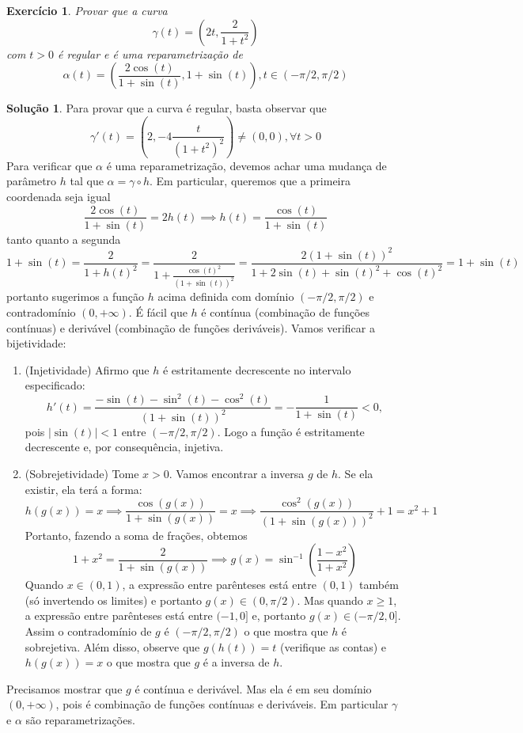 \documentclass[a4paper,12pt]{article}
\theoremstyle{exer}
\newtheorem{exercise}{Exercício}
\theoremstyle{definition}
\newtheorem{solution}{Solução}
\theoremstyle{plain}
\begin{document}
\begin{exercise}
    Provar que a curva
    $$\gamma(t) = \left(2t, \frac{2}{1+t^2}\right)$$ 
    com $t > 0$ é regular e é uma reparametrização de
    $$\alpha(t) = \left(\frac{2\cos(t)}{1 + \sin(t)}, 1 + \sin(t)\right), t
    \in (-\pi/2, \pi/2)$$
\end{exercise}

\begin{solution}
    Para provar que a curva é regular, basta observar que 
    $$
    \gamma '(t) = \left(2, -4\frac{t}{(1+ t^2)^2}\right) \neq (0,0), \forall t > 0
    $$
    Para verificar que $\alpha$ é uma reparametrização, devemos achar uma
    mudança de parâmetro $h$ tal que $\alpha = \gamma \circ h$. Em particular,
    queremos que a primeira coordenada seja igual
    $$
    \frac{2\cos(t)}{1 + \sin(t)} = 2h(t) \implies h(t) = \frac{\cos(t)}{1 + \sin(t)}
    $$
    tanto quanto a segunda 
    $$
    1 + \sin(t) = \frac{2}{1 + h(t)^2} = \frac{2}{1 + \frac{\cos(t)^2}{(1 + \sin(t))^2}} = \frac{2(1 + \sin(t))^2}{1 + 2\sin(t) + \sin(t)^2 + \cos(t)^2} = 1 + \sin(t)
    $$
    portanto sugerimos a função $h$ acima definida com domínio
    $(-\pi/2,\pi/2)$ e contradomínio $(0, + \infty)$. É fácil que $h$ é
    contínua (combinação de funções contínuas) e derivável (combinação de
    funções deriváveis). Vamos verificar a bijetividade: 
    \begin{enumerate}
        \item (Injetividade) Afirmo que $h$ é estritamente decrescente no
        intervalo especificado: 
        $$
        h'(t) = \frac{-\sin(t) -\sin^2(t) - \cos^2(t)}{(1 + \sin(t))^2} = -\frac{1}{1 + \sin(t)} < 0, 
        $$
        pois $|\sin(t)| < 1$ entre $(-\pi/2, \pi/2)$. Logo a função é
        estritamente decrescente e, por consequência, injetiva. 
        
        \item (Sobrejetividade) Tome $x > 0$. Vamos encontrar a inversa $g$ de
        $h$. Se ela existir, ela terá a forma: 
        $$
        h(g(x)) = x \implies \frac{\cos(g(x))}{1 + \sin(g(x))} = x \implies \frac{\cos^2(g(x))}{(1 + \sin(g(x)))^2} + 1 = x^2 + 1
        $$
        Portanto, fazendo a soma de frações, obtemos
        $$
        1 + x^2 = \frac{2}{1 + \sin(g(x))} \implies g(x) = \sin^{-1}\left(\frac{1 - x^2}{1 + x^2}\right)
        $$
        Quando $x \in (0,1)$, a expressão entre parênteses está entre $(0,1)$
        também (só invertendo os limites) e portanto $g(x) \in (0, \pi/2)$.
        Mas quando $x \ge 1$, a expressão entre parênteses está entre $(-1,
        0]$ e, portanto $g(x) \in (-\pi/2, 0]$. Assim o contradomínio de $g$ é
        $(-\pi/2, \pi/2)$ o que mostra que $h$ é sobrejetiva. Além disso,
        observe que $g(h(t)) = t$ (verifique as contas) e $h(g(x)) = x$ o que
        mostra que $g$ é a inversa de $h$. 
    \end{enumerate}
    Precisamos mostrar que $g$ é contínua e derivável. Mas ela é em seu
    domínio $(0, +\infty)$, pois é combinação de funções contínuas e
    deriváveis. 
    Em particular $\gamma$ e $\alpha$ são reparametrizações. 
\end{solution}
\end{document}
